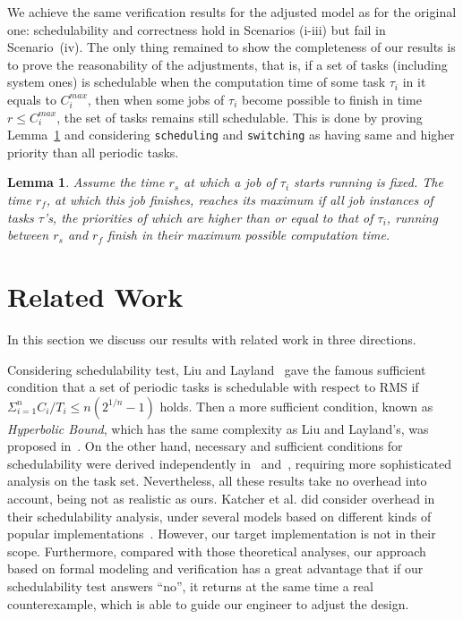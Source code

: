 \documentclass[10pt,journal]{IEEEtran}
\newtheorem{lemma}{Lemma}
\begin{document}
{We achieve the same verification results for the adjusted model as for
the original one: schedulability and correctness hold in Scenarios
(i-iii) but fail in Scenario~(iv). The only thing remained to show the
completeness of our results is to prove the reasonability of the
adjustments, that is, if a set of tasks (including system ones) is
schedulable when the computation time of some task $\tau_i$ in it
equals to $C_i^{max}$, then when some jobs of $\tau_i$ become possible
to finish in time $r\le C_i^{max}$, the set of tasks remains still
schedulable. This is done by proving Lemma~\ref{l:max} and considering
\verb|scheduling| and \verb|switching| as having same and higher
priority than all periodic tasks.
\begin{lemma}
\label{l:max}
Assume the time $r_s$ at which a job of $\tau_i$ starts running is
fixed. The time $r_f$, at which this job finishes, reaches its maximum
if all job instances of tasks $\tau$'s, the priorities of which are
higher than or equal to that of $\tau_i$, running between $r_s$ and
$r_f$ finish in their maximum possible computation time.
\end{lemma}
}

\section{Related Work}
\label{s:relate}
In this section we discuss our results with related
work in three directions.

Considering schedulability test, Liu and
Layland~\cite{DBLP:journals/jacm/LiuL73} gave the famous sufficient
condition that a set of periodic tasks is schedulable with respect to
RMS if $\displaystyle \Sigma^n_{i=1} C_i/T_i \le n(2^{1/n}-1)$
holds. Then a more sufficient condition, known as \emph{Hyperbolic
  Bound}, which has the same complexity as Liu and Layland's, was
proposed in~\cite{DBLP:journals/tc/BiniBB03}. On the other hand,
necessary and sufficient conditions for schedulability were derived
independently in~\cite{DBLP:journals/rts/SpruntSL89}
and~\cite{audsley1993deadline}, requiring more sophisticated analysis
on the task set. Nevertheless, all these results take no overhead into
account, being not as realistic as ours. Katcher et al. did consider
overhead in their schedulability analysis, under several models based
on different kinds of popular
implementations~\cite{DBLP:journals/tse/KatcherAS93}.  However, our
target implementation is not in their scope.  Furthermore, compared
with those theoretical analyses, our approach based on formal modeling
and verification has a great advantage that if our schedulability test
answers ``no'', it returns at the same time a real counterexample,
which is able to guide our engineer to adjust the design.
\end{document}
